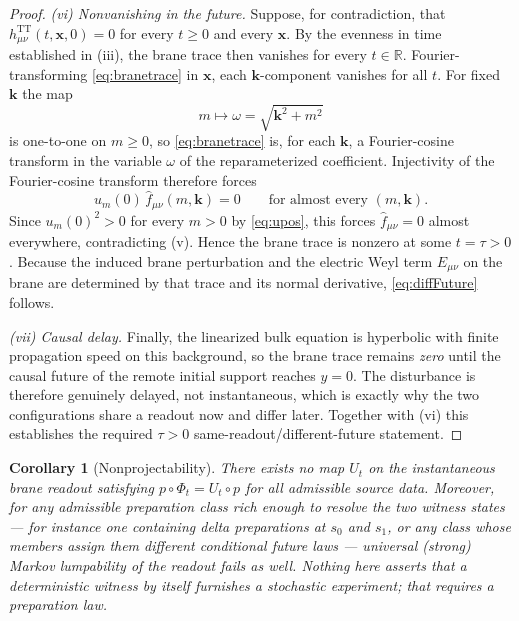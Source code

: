 \documentclass[11pt,a4paper]{article}
\theoremstyle{plain}
\newtheorem{corollary}[theorem]{Corollary}
\theoremstyle{definition}
\newcommand{\TT}{\mathrm{TT}}
\begin{document}
\begin{proof}
\emph{(vi) Nonvanishing in the future.} Suppose, for contradiction, that
$h^{\TT}_{\mu\nu}(t,\mathbf x,0)=0$ for every $t\ge0$ and every
$\mathbf x$. By the evenness in time established in (iii), the brane trace
then vanishes for every $t\in\mathbb R$. Fourier-transforming
\eqref{eq:branetrace} in $\mathbf x$, each $\mathbf k$-component vanishes
for all $t$. For fixed $\mathbf k$ the map
\begin{equation}
\label{eq:momega}
m\longmapsto\omega=\sqrt{\mathbf k^2+m^2}
\end{equation}
is one-to-one on $m\ge0$, so \eqref{eq:branetrace} is, for each
$\mathbf k$, a Fourier-cosine transform in the variable $\omega$ of the
reparameterized coefficient. Injectivity of the Fourier-cosine transform
therefore forces
\begin{equation}
\label{eq:forced}
u_m(0)\,\widehat f_{\mu\nu}(m,\mathbf k)=0
\qquad\text{for almost every }(m,\mathbf k).
\end{equation}
Since $u_m(0)^2>0$ for every $m>0$ by \eqref{eq:upos}, this forces
$\widehat f_{\mu\nu}=0$ almost everywhere, contradicting (v). Hence the
brane trace is nonzero at some $t=\tau>0$. Because the induced brane
perturbation and the electric Weyl term $E_{\mu\nu}$ on the brane are
determined by that trace and its normal derivative, \eqref{eq:diffFuture}
follows.

\emph{(vii) Causal delay.} Finally, the linearized bulk equation is
hyperbolic with finite propagation speed on this background, so the brane
trace remains \emph{zero} until the causal future of the remote initial
support reaches $y=0$. The disturbance is therefore genuinely delayed, not
instantaneous, which is exactly why the two configurations share a readout
now and differ later. Together with (vi) this establishes the required
$\tau>0$ same-readout/different-future statement.
\end{proof}

\begin{corollary}[Nonprojectability]
\label{cor:nonproj}
There exists no map $U_t$ on the instantaneous brane readout satisfying
$p\circ\Phi_t=U_t\circ p$ for all admissible source data. Moreover, for
any admissible preparation class rich enough to resolve the two witness
states --- for instance one containing delta preparations at $s_0$ and
$s_1$, or any class whose members assign them different conditional
future laws --- universal (strong) Markov lumpability of the readout
fails as well. Nothing here asserts that a deterministic witness by
itself furnishes a stochastic experiment; that requires a preparation
law.
\end{corollary}
\end{document}
